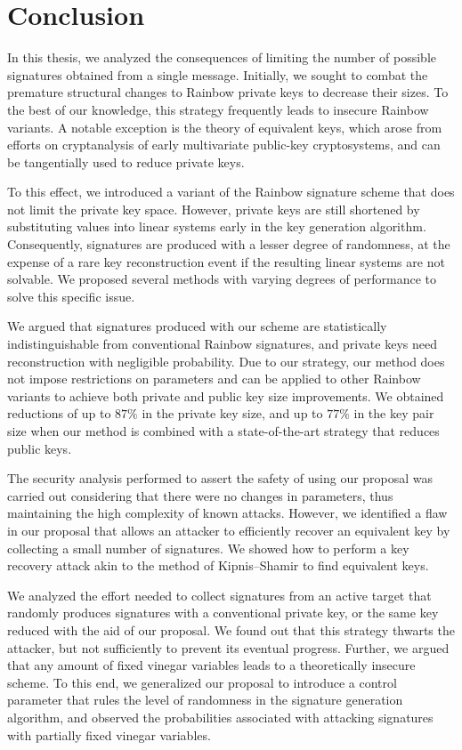 \documentclass[english]{ufsc-thesis-rn46-2019/ufsc-thesis-rn46-2019}
\theoremstyle{definition}
\begin{document}
\chapter{Conclusion}\label{ch:conc}

In this thesis, we analyzed the consequences of limiting the number of possible
signatures obtained from a single message. Initially, we sought to combat the
premature structural changes to Rainbow private keys to decrease their
sizes. To the best of our knowledge, this strategy frequently leads to insecure
Rainbow variants. A notable exception is the theory of equivalent keys, which
arose from efforts on cryptanalysis of early multivariate public-key
cryptosystems, and can be tangentially used to reduce private keys.

To this effect, we introduced a variant of the Rainbow signature scheme that
does not limit the private key space. However, private keys are still shortened
by substituting values into linear systems early in the key generation
algorithm. Consequently, signatures are produced with a lesser degree of
randomness, at the expense of a rare key reconstruction event if the resulting
linear systems are not solvable. We proposed several methods with varying
degrees of performance to solve this specific issue.

We argued that signatures produced with our scheme are statistically
indistinguishable from conventional Rainbow signatures, and private keys need
reconstruction with negligible probability. Due to our strategy, our method
does not impose restrictions on parameters and can be applied to other Rainbow
variants to achieve both private and public key size improvements. We obtained
reductions of up to $87\%$ in the private key size, and up to $77\%$ in the key
pair size when our method is combined with a state-of-the-art strategy that
reduces public keys.

The security analysis performed to assert the safety of using our proposal was
carried out considering that there were no changes in parameters, thus
maintaining the high complexity of known attacks. However, we identified a flaw
in our proposal that allows an attacker to efficiently recover an equivalent
key by collecting a small number of signatures. We showed how to perform a key
recovery attack akin to the method of Kipnis--Shamir to find equivalent keys.

We analyzed the effort needed to collect signatures from an active target that
randomly produces signatures with a conventional private key, or the same key
reduced with the aid of our proposal. We found out that this strategy thwarts
the attacker, but not sufficiently to prevent its eventual progress. Further,
we argued that any amount of fixed vinegar variables leads to a theoretically
insecure scheme. To this end, we generalized our proposal to introduce
a control parameter that rules the level of randomness in the signature
generation algorithm, and observed the probabilities associated with attacking
signatures with partially fixed vinegar variables.
\end{document}
